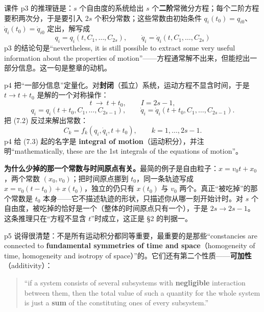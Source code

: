 \documentclass[11pt]{ctexart}
\begin{document}

课件 p3 的推理链是：$s$ 个自由度的系统给出 $s$ 个\textbf{二阶}常微分方程；每个二阶方程要积两次分，于是要引入 $2s$ 个积分常数；这些常数由初始条件 $q_i(t_0)=q_{i0}$、$\dot q_i(t_0)=\dot q_{i0}$ 定出，解写成
\[
q_i=q_i(t,C_1,\dots,C_{2s}),\qquad \dot q_i=\dot q_i(t,C_1,\dots,C_{2s}) \tag{7.1}
\]
p3 的结论句是“nevertheless, it is still possible to extract some very useful information about the properties of motion”——方程通常解不出来，但能挖出一部分信息。这一句是整章的动机。

p4 把“一部分信息”定量化。对\textbf{封闭}（孤立）系统，运动方程不显含时间，于是 $t\to t+t_0$ 是解的一个对称操作：
\[
t\ \longrightarrow\ t+t_0,\qquad I=2s-1,
\]
\[
q_i=q_i(t+t_0,C_1,\dots,C_{2s-1}),\qquad \dot q_i=\dot q_i(t+t_0,C_1,\dots,C_{2s-1}). \tag{7.2}
\]
把 (7.2) 反过来解出常数：
\[
C_k=f_k(q_i,\dot q_i,t+t_0),\qquad k=1,\dots,2s-1. \tag{7.3}
\]
p4 给 (7.3) 起的名字是 \textbf{integral of motion}（运动积分），并注明“mathematically, these are the 1st integrals of the equations of motion”。


\textbf{为什么少掉的那一个常数与时间原点有关。}最简的例子是自由粒子：$x=v_0t+x_0$，两个常数 $(x_0,v_0)$；把时间原点挪到 $t_0$，同一条轨迹写成 $x=v_0(t-t_0)+x(t_0)$，独立的仍只有 $x(t_0)$ 与 $v_0$ 两个。真正“被吃掉”的那个常数是 $t_0$ 本身——它不描述轨迹的形状，只描述你从哪一刻开始计时。对 $s$ 个自由度，被吃掉的恰好是一个（整体的时间原点只有一个），于是 $2s\to2s-1$。这条推理只在“方程不显含 $t$”时成立，这正是 §2 的判据一。


p5 说得很清楚：不是所有运动积分都同等重要，最重要的是那些“constancies are connected to \textbf{fundamental symmetries of time and space}（homogeneity of time, homogeneity and isotropy of space）”的。它们还有第二个性质——\textbf{可加性}（additivity）：

\begin{quote}
“if a system consists of several subsystems with \textbf{negligible} interaction between them, then the total value of such a quantity for the whole system is just a \textbf{sum} of the constituting ones of every subsystem.”
\end{quote}
\end{document}
